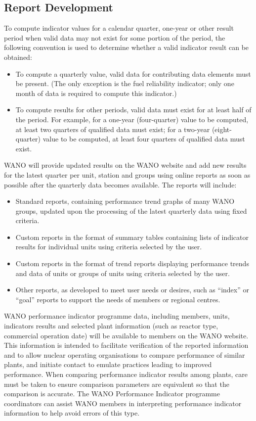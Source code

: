 \subsection*{Report Development}
To compute indicator values for a calendar quarter, one-year or other
result period when valid data may not exist for some portion of the
period, the following convention is used to determine whether a valid
indicator result can be obtained:
\begin{itemize}
\item To compute a quarterly value, valid data for contributing data elements must be present. (The only exception is the fuel reliability indicator; only one month of data is required to compute this indicator.)
\item To compute results for other periods, valid data must exist for
  at least half of the period. For example, for a one-year
  (four-quarter) value to be computed, at least two quarters of
  qualified data must exist; for a two-year (eight-quarter) value to
  be computed, at least four quarters of qualified data must exist.
\end{itemize}
WANO will provide updated results on the WANO website and add new
results for the latest quarter per unit, station and groups using
online reports as soon as possible after the quarterly data becomes
available. The reports will include:
\begin{itemize}
\item Standard reports, containing performance trend graphs of many WANO groups, updated upon the processing of the latest quarterly data using fixed criteria.
\item Custom reports in the format of summary tables containing lists of indicator results for individual units using criteria selected by the user.
\item Custom reports in the format of trend reports displaying performance trends and data of units or groups of units using criteria selected by the user.
\item Other reports, as developed to meet user needs or desires, such
  as “index” or “goal” reports to support the needs of members or
  regional centres.
\end{itemize}
WANO performance indicator programme data, including members, units, indicators results and selected plant information (such as reactor type, commercial operation date) will be available to members on the WANO website. This information is intended to facilitate verification of the reported information and to allow nuclear operating organisations to compare performance of similar plants, and initiate contact to emulate practices leading to improved performance. When comparing performance indicator results among plants, care must be taken to ensure comparison parameters are equivalent so that the comparison is accurate. The WANO Performance Indicator programme coordinators can assist WANO members in interpreting performance indicator information to help avoid errors of this type.
